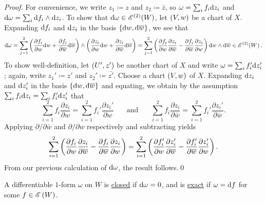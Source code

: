 \documentclass[../Moduli_Spaces_of_Riemann_Surfaces.tex]{subfiles}
\begin{document}
    \begin{proof}
        For convenience, we write $z_1\coloneqq z$ and $z_2\coloneqq\bar{z}$, so $\omega=\sum_if_i\mathrm{d} z_i$ and $\mathrm{d}\omega=\sum_i\mathrm{d} f_i\wedge\mathrm{d} z_i$. To show that $\mathrm{d}\omega\in\mathscr{E}^{\left(2\right)}\!\left(W\right)$, let $\left(V,w\right)$ be a chart of $X$. Expanding $\mathrm{d} f_i$ and $\mathrm{d} z_i$ in the basis $\left\{\mathrm{d} w,\mathrm{d}\overline{w}\right\}$, we see that
            \begin{equation*}
                \mathrm{d}\omega=\sum_{j=1}^{2}\left(\frac{\partial f_i}{\partial w}\mathrm{d} w+\frac{\partial f_i}{\partial\overline{w}}\mathrm{d}\overline{w}\right)\wedge\left(\frac{\partial z_i}{\partial w}\mathrm{d} w+\frac{\partial z_i}{\partial\overline{w}}\mathrm{d}\overline{w}\right)=\sum_{j=1}^{2}\left(\frac{\partial f_i}{\partial w}\frac{\partial z_i}{\partial\overline{w}}-\frac{\partial f_i}{\partial\overline{w}}\frac{\partial z_i}{\partial w}\right)\mathrm{d} w\wedge\mathrm{d}\overline{w}\in\mathscr{E}^{\left(2\right)}\!\left(W\right).
            \end{equation*}
        To show well-definition, let $\left(U',z'\right)$ be another chart of $X$ and write $\omega=\sum_if_i'\mathrm{d} z_i'$; again, write $z_1'\coloneqq z'$ and $z_2'\coloneqq\bar{z'}$. Choose a chart $\left(V,w\right)$ of $X$. Expanding $\mathrm{d} z_i$ and $\mathrm{d} z_i'$ in the basis $\left\{\mathrm{d} w,\mathrm{d}\overline{w}\right\}$ and equating, we obtain by the assumption $\sum_if_i\mathrm{d} z_i=\sum_if_i'\mathrm{d} z_i'$ that
        \begin{equation*}
            \sum_{i=1}^{2}f_i\frac{\partial z_i}{\partial w}=\sum_{i=1}^{2}f_i'\frac{\partial z_i'}{\partial w}\ \ \ \ \ \ \ \ \textrm{and}\ \ \ \ \ \ \ \ \sum_{i=1}^{2}f_i\frac{\partial z_i}{\partial\bar{w}}=\sum_{i=1}^{2}f_i'\frac{\partial z_i'}{\partial\bar{w}}.
        \end{equation*}
        Applying $\partial/\partial\bar{w}$ and $\partial/\partial w$ respectively and subtracting yields
        \begin{equation*}
            \sum_{i=1}^{2}\left(\frac{\partial f_i}{\partial w}\frac{\partial z_i}{\partial\overline{w}}-\frac{\partial f_i}{\partial\overline{w}}\frac{\partial z_i}{\partial w}\right)=\sum_{i=1}^{2}\left(\frac{\partial f_i'}{\partial w}\frac{\partial z_i'}{\partial\overline{w}}-\frac{\partial f_i'}{\partial\overline{w}}\frac{\partial z_i'}{\partial w}\right).
        \end{equation*}
        From our previous calculation of $\mathrm{d}\omega$, the result follows.\qed
    \end{proof}
    \begin{definition}
        A differentiable $1$-form $\omega$ on $W$ is \ul{closed} if $\mathrm{d}\omega=0$, and is \ul{exact} if $\omega=\mathrm{d} f$ for some $f\in\mathscr{E}\left(W\right)$.
    \end{definition}
\end{document}
